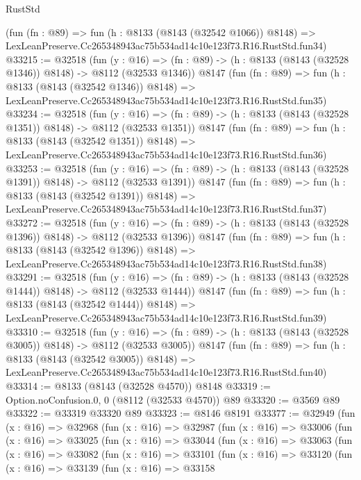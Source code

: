 \begin{lexlean}{RustStd}
\begin{coremodule}
    (fun (fn : @89) =>
    fun (h : @8133 (@8143 (@32542 @1066)) @8148) =>
    LexLeanPreserve.Cc265348943ac75b534ad14c10e123f73.R16.RustStd.fun34)
@33215 := @32518
    (fun (y : @16) =>
    (fn : @89) -> (h : @8133 (@8143 (@32528 @1346)) @8148) -> @8112 (@32533 @1346))
    @8147
    (fun (fn : @89) =>
    fun (h : @8133 (@8143 (@32542 @1346)) @8148) =>
    LexLeanPreserve.Cc265348943ac75b534ad14c10e123f73.R16.RustStd.fun35)
@33234 := @32518
    (fun (y : @16) =>
    (fn : @89) -> (h : @8133 (@8143 (@32528 @1351)) @8148) -> @8112 (@32533 @1351))
    @8147
    (fun (fn : @89) =>
    fun (h : @8133 (@8143 (@32542 @1351)) @8148) =>
    LexLeanPreserve.Cc265348943ac75b534ad14c10e123f73.R16.RustStd.fun36)
@33253 := @32518
    (fun (y : @16) =>
    (fn : @89) -> (h : @8133 (@8143 (@32528 @1391)) @8148) -> @8112 (@32533 @1391))
    @8147
    (fun (fn : @89) =>
    fun (h : @8133 (@8143 (@32542 @1391)) @8148) =>
    LexLeanPreserve.Cc265348943ac75b534ad14c10e123f73.R16.RustStd.fun37)
@33272 := @32518
    (fun (y : @16) =>
    (fn : @89) -> (h : @8133 (@8143 (@32528 @1396)) @8148) -> @8112 (@32533 @1396))
    @8147
    (fun (fn : @89) =>
    fun (h : @8133 (@8143 (@32542 @1396)) @8148) =>
    LexLeanPreserve.Cc265348943ac75b534ad14c10e123f73.R16.RustStd.fun38)
@33291 := @32518
    (fun (y : @16) =>
    (fn : @89) -> (h : @8133 (@8143 (@32528 @1444)) @8148) -> @8112 (@32533 @1444))
    @8147
    (fun (fn : @89) =>
    fun (h : @8133 (@8143 (@32542 @1444)) @8148) =>
    LexLeanPreserve.Cc265348943ac75b534ad14c10e123f73.R16.RustStd.fun39)
@33310 := @32518
    (fun (y : @16) =>
    (fn : @89) -> (h : @8133 (@8143 (@32528 @3005)) @8148) -> @8112 (@32533 @3005))
    @8147
    (fun (fn : @89) =>
    fun (h : @8133 (@8143 (@32542 @3005)) @8148) =>
    LexLeanPreserve.Cc265348943ac75b534ad14c10e123f73.R16.RustStd.fun40)
@33314 := @8133 (@8143 (@32528 @4570)) @8148
@33319 := Option.noConfusion.{0, 0} (@8112 (@32533 @4570)) @89
@33320 := @3569 @89
@33322 := @33319 @33320 @89
@33323 := @8146 @8191
@33377 := @32949
    (fun (x : @16) =>
    @32968
      (fun (x : @16) =>
      @32987
        (fun (x : @16) =>
        @33006
          (fun (x : @16) =>
          @33025
            (fun (x : @16) =>
            @33044
              (fun (x : @16) =>
              @33063
                (fun (x : @16) =>
                @33082
                  (fun (x : @16) =>
                  @33101
                    (fun (x : @16) =>
                    @33120
                      (fun (x : @16) =>
                      @33139
                        (fun (x : @16) =>
                        @33158

\end{coremodule}
\end{lexlean}
